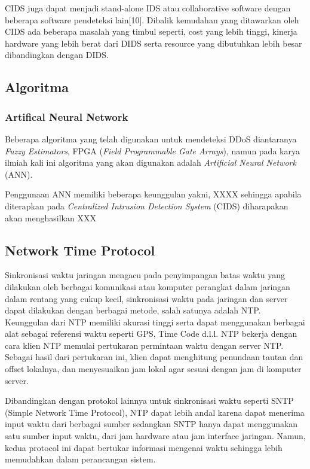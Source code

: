 CIDS juga dapat menjadi stand-alone IDS atau collaborative software dengan beberapa software pendeteksi lain[10]. Dibalik kemudahan yang ditawarkan oleh CIDS ada beberapa masalah yang timbul seperti, cost yang lebih tinggi, kinerja hardware yang lebih berat dari DIDS serta resource yang dibutuhkan lebih besar dibandingkan dengan DIDS.





\subsection{Algoritma}
\subsubsection{Artifical Neural Network}
    Beberapa algoritma yang telah digunakan untuk mendeteksi DDoS diantaranya \textit{Fuzzy Estimators}, FPGA (\textit{Field Programmable Gate Arrays}), namun pada karya ilmiah kali ini algoritma yang akan digunakan adalah \textit{Artificial Neural Network} (ANN).
    
    Penggunaan ANN memiliki beberapa keunggulan yakni, XXXX sehingga apabila diterapkan pada \textit{Centralized Intrusion Detection System} (CIDS) diharapakan akan menghasilkan XXX

\subsection{Network Time Protocol}

Sinkronisasi waktu jaringan mengacu pada penyimpangan batas waktu yang dilakukan oleh berbagai komunikasi atau komputer perangkat dalam jaringan dalam rentang yang cukup kecil\cite{ntp1}, sinkronisasi waktu pada jaringan dan server dapat dilakukan dengan berbagai metode, salah satunya adalah NTP. Keunggulan dari NTP memiliki akurasi tinggi serta dapat menggunakan berbagai alat sebagai referensi waktu seperti GPS, Time Code d.l.l. NTP bekerja dengan cara klien NTP memulai pertukaran permintaan waktu dengan server NTP. Sebagai hasil dari pertukaran ini, klien dapat menghitung penundaan tautan dan offset lokalnya, dan menyesuaikan jam lokal agar sesuai dengan jam di komputer server.

Dibandingkan dengan protokol lainnya untuk sinkronisasi waktu seperti SNTP (Simple Network Time Protocol), NTP dapat lebih andal karena dapat menerima input waktu dari berbagai sumber sedangkan SNTP hanya dapat menggunakan satu sumber input waktu, dari jam hardware atau jam interface jaringan. Namun, kedua protocol ini dapat bertukar informasi mengenai waktu sehingga lebih memudahkan dalam perancangan sistem.


